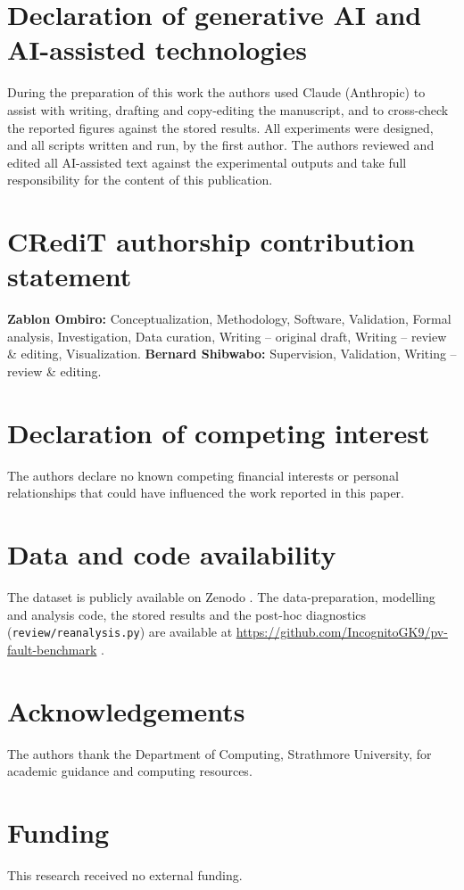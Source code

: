 \documentclass[11pt,a4paper]{article}
\begin{document}
\section*{Declaration of generative AI and AI-assisted technologies}
During the preparation of this work the authors used Claude (Anthropic) to assist with writing, drafting and copy-editing the manuscript, and to cross-check the reported figures against the stored results. All experiments were designed, and all scripts written and run, by the first author. The authors reviewed and edited all AI-assisted text against the experimental outputs and take full responsibility for the content of this publication.

\section*{CRediT authorship contribution statement}
\textbf{Zablon Ombiro:} Conceptualization, Methodology, Software, Validation, Formal analysis, Investigation, Data curation, Writing -- original draft, Writing -- review \& editing, Visualization. \textbf{Bernard Shibwabo:} Supervision, Validation, Writing -- review \& editing.

\section*{Declaration of competing interest}
The authors declare no known competing financial interests or personal relationships that could have influenced the work reported in this paper.

\section*{Data and code availability}
The dataset is publicly available on Zenodo \citep{Graillet2022}. The data-preparation, modelling and analysis code, the stored results and the post-hoc diagnostics (\texttt{review/reanalysis.py}) are available at \url{https://github.com/IncognitoGK9/pv-fault-benchmark} \citep{Ombiro2026}.

\section*{Acknowledgements}
The authors thank the Department of Computing, Strathmore University, for academic guidance and computing resources.

\section*{Funding}
This research received no external funding.
\end{document}

